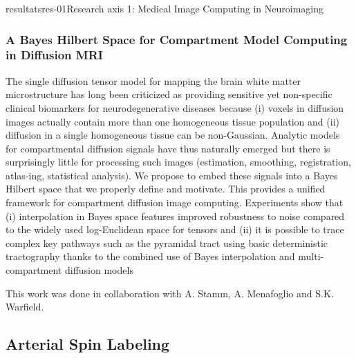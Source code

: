 \documentclass{ra2018}
\begin{document}
\begin{module}{resultats}{res-01}{Research axis 1: Medical Image Computing in Neuroimaging}
\subsubsection{A Bayes Hilbert Space for Compartment Model Computing in Diffusion MRI}
\begin{participants}
\end{participants}
The single diffusion tensor model for mapping the brain white matter microstructure has long been criticized as providing sensitive yet non-specific clinical biomarkers for neurodegenerative diseases because (i) voxels in diffusion images actually contain more than one homogeneous tissue population and (ii) diffusion in a single homogeneous tissue can be non-Gaussian. Analytic models for compartmental diffusion signals have thus naturally emerged but there is surprisingly little for processing such images (estimation, smoothing, registration, atlas-ing, statistical analysis). We propose to embed these signals into a Bayes Hilbert space that we properly define and motivate. This provides a unified framework for compartment diffusion image computing. Experiments show that (i) interpolation in Bayes space features improved robustness to noise compared to the widely used log-Euclidean space for tensors and (ii) it is possible to trace complex key pathways such as the pyramidal tract using basic deterministic tractography thanks to the combined use of Bayes interpolation and multi-compartment diffusion models~\cite{stamm:inserm-01937992}

This work was done in collaboration with A. Stamm, A. Menafoglio and S.K. Warfield.

\subsection{Arterial Spin Labeling}

\end{module}
\end{document}
